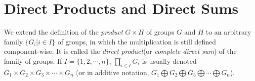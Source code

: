 \section{Direct Products and Direct Sums}
\begin{definition}
	We extend the definition of the \textit{product} $ G \times H $ of groups $ G $ and $ H $ to an arbitrary family $ \{G_i| i\in I \} $ of groups, in which the multiplication is still defined component-wise. It is called the \textit{direct product}(or \textit{complete direct sum}) of the family of groups. If $ I=\{1,2,\cdots,n \} $, $ \prod_{i\in I}G_i $ is usually denoted $ G_1 \times G_2 \times G_3 \times \cdots \times G_n$ (or in additive notation, $ G_1 \bigoplus G_2 \bigoplus G_3 \bigoplus \cdots \bigoplus G_n$).
\end{definition}

